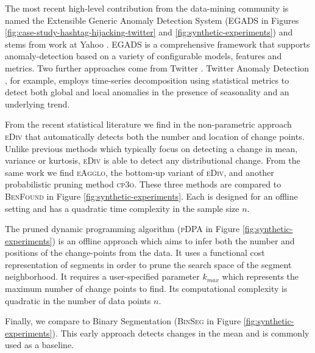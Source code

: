 \documentclass[twoside,leqno,twocolumn]{article}\usepackage[]{graphicx}\usepackage[]{color}
\newcommand{\algoname}{\textsc{BenFound}}
\newcommand{\eDiv}{\textsc{eDiv}}
\newcommand{\eAgglo}{\textsc{eAgglo}}
\newcommand{\cpppo}{\textsc{cp3o}}
\newcommand{\pDPA}{\textsc{pDPA}}
\newcommand{\BinSegMean}{\textsc{BinSeg-Mean}}
\newcommand{\BinSeg}{\textsc{BinSeg}}
\newcommand{\BinSegVar}{\textsc{BinSeg-Var}}
\newcommand{\BinSegMeanVar}{\textsc{BinSeg-MeanVar}}
\begin{document}
The most recent high-level contribution from the data-mining community is named the Extensible Generic Anomaly Detection System (EGADS in Figures \ref{fig:case-study-hashtag-hijacking-twitter} and \ref{fig:synthetic-experiments}) and stems from work at Yahoo \cite{laptev2015egads}. EGADS is a comprehensive framework that supports anomaly-detection based on a variety of configurable models, features and metrics. Two further approaches come from Twitter \cite{james2014twitter,vallis2014novel}. Twitter Anomaly Detection \cite{james2014twitter}, for example, employs time-series decomposition using statistical metrics to detect both global and local anomalies in the presence of seasonality and an underlying trend.

From the recent statistical literature we find in \cite{matteson2013} the non-parametric approach \eDiv{} that automatically detects both the number and location of change points. Unlike previous methods which typically focus on detecting a change in mean, variance or kurtosis, \eDiv{} is able to detect any distributional change. From the same work we find \eAgglo{}, the bottom-up variant of \eDiv{}, and another probabilistic pruning method \cpppo{}. These three methods are compared to \algoname{} in Figure \ref{fig:synthetic-experiments}. Each is designed for an offline setting and has a quadratic time complexity in the sample size $n$. %

The pruned dynamic programming algorithm \cite{rigaill2010} (\pDPA{} in Figure \ref{fig:synthetic-experiments}) is an offline approach which aims to infer both the number and positions of the change-points from the data. It uses a functional cost representation of segments in order to prune the search space of the segment neighborhood. It requires a user-specified parameter $k_{max}$ which represents the maximum number of change points to find. Its computational complexity is quadratic in the number of data points $n$.

Finally, we compare to Binary Segmentation \cite{scott1974Grouping,edwards1965cluster} (\BinSeg{} in Figure \ref{fig:synthetic-experiments}). This early approach detects changes in the mean and is commonly used as a baseline. 

\end{document}
